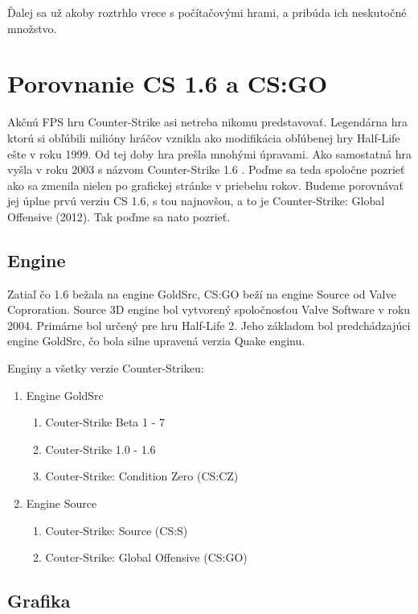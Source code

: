 \documentclass[10pt,oneside,slovak,a4paper]{article}
\begin{document}
Ďalej sa už akoby roztrhlo vrece s počítačovými hrami, a pribúda ich neskutočné množstvo.

\section{Porovnanie CS 1.6 a CS:GO} \label{porovnanie}

Akčnú FPS hru Counter-Strike asi netreba nikomu predstavovať. Legendárna hra ktorú si obľúbili milióny hráčov vznikla ako modifikácia obľúbenej hry Half-Life ešte v roku 1999. Od tej doby hra prešla mnohými úpravami. Ako samostatná hra vyšla v roku 2003 s názvom Counter-Strike 1.6 . Poďme sa teda spoločne pozrieť ako sa zmenila nielen po grafickej stránke v priebehu rokov. Budeme porovnávať jej úplne prvú verziu CS 1.6, s tou najnovšou, a to je Counter-Strike: Global Offensive (2012). Tak poďme sa nato pozrieť.


\subsection{Engine} \label{porovnanie:engine}
Zatiaľ čo 1.6 bežala na engine GoldSrc, CS:GO beží na engine Source od Valve Coproration. Source 3D engine bol vytvorený spoločnosťou Valve Software v roku 2004. Primárne bol určený pre hru Half-Life 2. Jeho základom bol predchádzajúci engine GoldSrc, čo bola silne upravená verzia Quake enginu.


Enginy a všetky verzie Counter-Strikeu:
\begin{enumerate}
\item Engine GoldSrc
	\begin{enumerate}
	\item Couter-Strike Beta 1 - 7
	\item Couter-Strike 1.0 - 1.6
	\item Couter-Strike: Condition Zero (CS:CZ)
	\end{enumerate}
\item Engine Source
	\begin{enumerate}
	\item Couter-Strike: Source (CS:S)
	\item Couter-Strike: Global Offensive (CS:GO)
	\end{enumerate}
\end{enumerate}



\subsection{Grafika} \label{porovnanie:grafika}
\end{document}
